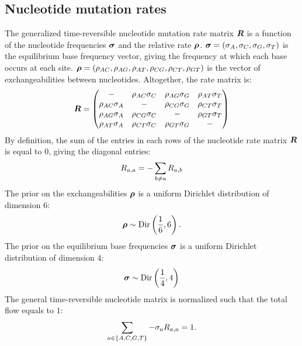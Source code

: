 \subsection{Nucleotide mutation rates}
The generalized time-reversible nucleotide mutation rate matrix $\bm{R}$ is a function of the nucleotide frequencies $\bm{\sigma}$ and the relative rate $\bm{\rho}$.
$\bm{\sigma} = (\sigma_A , \sigma_C , \sigma_G , \sigma_T)$ is the equilibrium base frequency vector, giving the frequency at which each base occurs at each site.
$\bm{\rho} = \left( \rho_{AC}, \rho_{AG}, \rho_{AT}, \rho_{CG}, \rho_{CT}, \rho_{GT}\right)$ is the vector of exchangeabilities between nucleotides.
Altogether, the rate matrix is:
\begin{equation}
\label{eq:gtr-mutrates}
\Mutmatrix =
	\begin{pmatrix}
		 - & {\exchan_{AC}\mutequi_C} & {\exchan_{AG}\mutequi_G} & {\exchan_{AT}\mutequi_T} \\
			 {\exchan_{AC}\mutequi_A} &                        - & {\exchan_{CG}\mutequi_G} & {\exchan_{CT}\mutequi_T} \\
			 {\exchan_{AG}\mutequi_A} & {\exchan_{CG}\mutequi_C} &                        - & {\exchan_{GT}\mutequi_T} \\
			 {\exchan_{AT}\mutequi_A} & {\exchan_{CT}\mutequi_C} & {\exchan_{GT}\mutequi_G} & -
	\end{pmatrix}
\end{equation}
By definition, the sum of the entries in each rows of the nucleotide rate matrix $\bm{R}$ is equal to $0$, giving the diagonal entries:
\begin{equation}
R_{a,a} = - \sum\limits_{ b \neq a} R_{a,b}
\end{equation}
The \gls{prior} on the exchangeabilities $\bm{\rho}$ is a uniform Dirichlet distribution of dimension $6$:
\begin{equation}
\label{eq:DistribExchan}
\Exchan \sim \mathrm{Dir}\left( \dfrac{1}{6} , 6\right).
\end{equation}
The \gls{prior} on the equilibrium base frequencies $\bm{\sigma}$ is a uniform Dirichlet distribution of dimension $4$:
\begin{equation}
\label{eq:DistribMutequi}
\Mutequi \sim \mathrm{Dir}\left( \dfrac{1}{4} , 4\right)
\end{equation}
The general time-reversible nucleotide matrix is normalized such that the total flow equals to $1$:
\begin{equation}
\sum\limits_{a \in \{A, C, G, T\}} - \sigma_a R_{a,a} = 1.
\end{equation}

